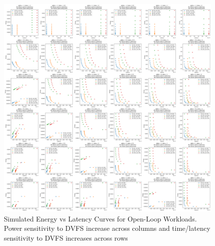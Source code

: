 \begin{figure}
\centering
\includegraphics[width=1.1\textwidth]{figures/full_model_plots.png}
\caption[]{Simulated Energy vs Latency Curves for Open-Loop Workloads. Power sensitivity to DVFS increase across columns and time/latency sensitivity to DVFS increases across rows}
\label{fig:simplotsfull}
\end{figure}

